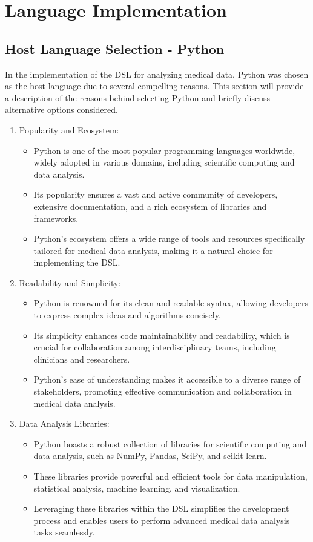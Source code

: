\chapter{Language Implementation}

\section{Host Language Selection - Python}

In the implementation of the DSL for analyzing medical data, Python was chosen as the host language due to several compelling reasons. This section will provide a description of the reasons behind selecting Python and briefly discuss alternative options considered.

\begin{enumerate}
  \item Popularity and Ecosystem:
    \begin{itemize}
      \item Python is one of the most popular programming languages worldwide, widely adopted in various domains, including scientific computing and data analysis. 
      \item Its popularity ensures a vast and active community of developers, extensive documentation, and a rich ecosystem of libraries and frameworks.
      \item Python's ecosystem offers a wide range of tools and resources specifically tailored for medical data analysis, making it a natural choice for implementing the DSL.
    \end{itemize}

  \item Readability and Simplicity:
    \begin{itemize}
      \item Python is renowned for its clean and readable syntax, allowing developers to express complex ideas and algorithms concisely.
      \item Its simplicity enhances code maintainability and readability, which is crucial for collaboration among interdisciplinary teams, including clinicians and researchers.
      \item Python's ease of understanding makes it accessible to a diverse range of stakeholders, promoting effective communication and collaboration in medical data analysis.
    \end{itemize}

  \item Data Analysis Libraries:
    \begin{itemize}
      \item Python boasts a robust collection of libraries for scientific computing and data analysis, such as NumPy, Pandas, SciPy, and scikit-learn.
      \item These libraries provide powerful and efficient tools for data manipulation, statistical analysis, machine learning, and visualization.
      \item Leveraging these libraries within the DSL simplifies the development process and enables users to perform advanced medical data analysis tasks seamlessly.
    \end{itemize}


\end{enumerate}
